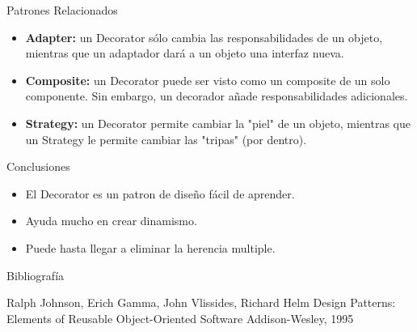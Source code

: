 \documentclass{beamer}
\begin{document}
\begin{frame}{Patrones Relacionados}
 \begin{itemize}
  \item \textbf{Adapter:} un Decorator sólo cambia las responsabilidades de un objeto, mientras que un adaptador dará a un objeto una interfaz nueva.
  \item \textbf{Composite:} un Decorator puede ser visto como un composite de un solo componente. Sin embargo, un decorador añade responsabilidades adicionales.
  \item \textbf{Strategy:} un Decorator permite cambiar la "piel" de un objeto, mientras que un Strategy le permite cambiar las "tripas" (por dentro).
 \end{itemize}
\end{frame}

\begin{frame}{Conclusiones}
 \begin{itemize}
  \item El Decorator es un patron de diseño fácil de aprender.
  \item Ayuda mucho en crear dinamismo.
  \item Puede hasta llegar a eliminar la herencia multiple.
 \end{itemize}
\end{frame}


\begin{frame}{Bibliografía}
  \begin{thebibliography}{10}
  \beamertemplatebookbibitems
    Ralph Johnson, Erich Gamma, John Vlissides, Richard Helm
    \newblock Design Patterns: Elements of Reusable Object-Oriented Software
    \newblock Addison-Wesley, 1995
   \end{thebibliography}
\end{frame}
 
\end{document}
